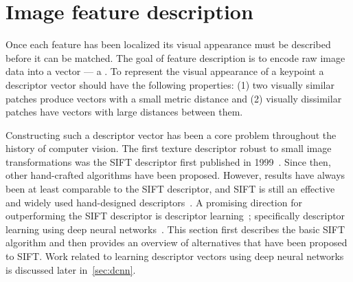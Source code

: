 \section{Image feature description}\label{sec:featuredescribe}  

    Once each feature has been localized its visual appearance must be
      described before it can be matched.
    The goal of feature description is to encode raw image data into a
      vector --- \ie{} a .
    To represent the visual appearance of a keypoint a descriptor
      vector should have the following properties:
    (1) two visually similar patches produce vectors with a small
      metric distance and
    (2) visually dissimilar patches have vectors with large distances
      between them.

    Constructing such a descriptor vector has been a core problem
      throughout the history of computer vision.
    The first texture descriptor robust to small image transformations
      was the SIFT descriptor first published in
      1999~\cite{lowe_object_1999, lowe_distinctive_2004}.
    Since then, other hand-crafted algorithms have been proposed.
    However, results have always been at least comparable to the SIFT
      descriptor, and SIFT is still an effective and widely used
      hand-designed descriptors~\cite{mikolajczyk_performance_2005,
      calonder_brief_2010, bay_surf_2006, leutenegger_brisk_2011,
      alahi_freak_2012, jegou_triangulation_2014}.
    A promising direction for outperforming the SIFT descriptor is
      descriptor learning~\cite{simonyan_descriptor_2012,
      simonyan_learning_2014, winder_picking_2009}; specifically
      descriptor learning using deep neural
      networks~\cite{razavian_cnn_2014, bengio_representation_2013,
      russakovsky_imagenet_2014}.
    This section first describes the basic SIFT algorithm and then
      provides an overview of alternatives that have been proposed to
      SIFT{}.
    Work related to learning descriptor vectors using deep neural
      networks is discussed later in~\cref{sec:dcnn}.
      
